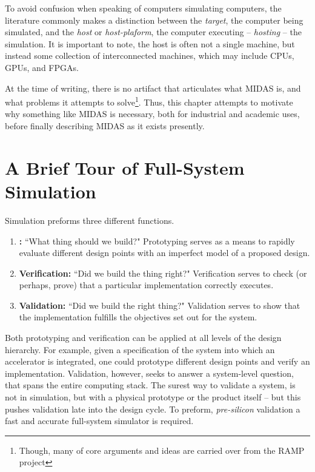 To avoid confusion when speaking of computers simulating computers, the
literature commonly makes a distinction between the \emph{target}, the computer
being simulated, and the \emph{host} or \emph{host-plaform}, the computer
executing -- \emph{hosting} -- the simulation. It is important to note, the
host is often not a single machine, but instead some collection of
interconnected machines, which may include CPUs, GPUs, and FPGAs.

At the time of writing, there is no artifact that articulates what MIDAS is,
and what problems it attempts to solve\footnote{Though, many of core arguments
and ideas are carried over from the RAMP project}. Thus, this chapter attempts
to motivate why something like MIDAS is necessary, both for industrial and
academic uses, before finally describing MIDAS as it exists presently.

\section{A Brief Tour of Full-System Simulation}

Simulation preforms three different functions.

\begin{enumerate}

    \item \textbf{:} ``What thing should we
        build?" Prototyping serves as a means to rapidly evaluate different
        design points with an imperfect model of a proposed design.

    \item \textbf{Verification:} ``Did we build the thing right?" Verification
        serves to check (or perhaps, prove) that a particular implementation
        correctly executes.

    \item \textbf{Validation:} ``Did we build the right thing?" Validation
        serves to show that the implementation fulfills the objectives set out
        for the system.

\end{enumerate}

Both prototyping and verification can be applied at all levels of the design
hierarchy.  For example, given a specification of the system into which an
accelerator is integrated, one could prototype different design points and
verify an implementation. Validation, however, seeks to answer a system-level
question, that spans the entire computing stack.  The surest way to validate a
system, is not in simulation, but with a physical prototype or the product
itself -- but this pushes validation late into the design cycle. To preform,
\emph{pre-silicon} validation a fast and accurate full-system simulator is
required.

